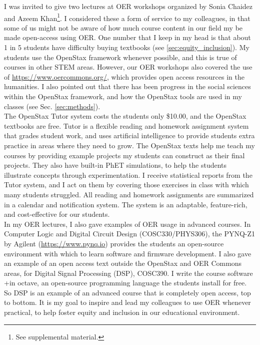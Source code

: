 \documentclass[../../../main.tex]{subfiles}
\begin{document}
\label{sec:oer_workshops}

I was invited to give two lectures at OER workshops organized by Sonia Chaidez and Azeem Khan\footnote{See supplemental material.}.  I considered these a form of service to my colleagues, in that some of us might not be aware of how much course content in our field my be made open-access using OER.  One number that I keep in my head is that about 1 in 5 students have difficulty buying textbooks (see \ref{sec:equity_inclusion}).  My students use the OpenStax framework whenever possible, and this is true of courses in other STEM areas.  However, our OER workshops also covered the use of \url{https://www.oercommons.org/}, which provides open access resources in the humanities.  I also pointed out that there has been progress in the social sciences within the OpenStax framework, and how the OpenStax tools are used in my classes (see Sec. \ref{sec:methods}).
\\
\vspace{0.15cm}
The OpenStax Tutor system costs the students only \$10.00, and the OpenStax textbooks are free.  Tutor is a flexible reading and homework assignment system that grades student work, and uses artificial intelligence to provide students extra practice in areas where they need to grow.  The OpenStax texts help me teach my courses by providing example projects my students can construct as their final projects.  They also have built-in PhET simulations, to help the students illustrate concepts through experimentation.  I receive statistical reports from the Tutor system, and I act on them by covering those exercises in class with which many students struggled.  All reading and homework assignments are summarized in a calendar and notification system.  The system is an adaptable, feature-rich, and cost-effective for our students.
\\
\vspace{0.15cm}
In my OER lectures, I also gave examples of OER usage in advanced courses.  In Computer Logic and Digital Circuit Design (COSC330/PHYS306), the PYNQ-Z1 by Agilent (\url{https://www.pynq.io}) provides the students an open-source environment with which to learn software and firmware development.  I also gave an example of an open access text outside the OpenStax and OER Commons areas, for Digital Signal Processing (DSP), COSC390.  I write the course software +in octave, an open-source programming language the students install for free.  So DSP is an example of an advanced course that is completely open access, top to bottom.  It is my goal to inspire and lead my colleagues to use OER whenever practical, to help foster equity and inclusion in our educational environment.
\end{document}
